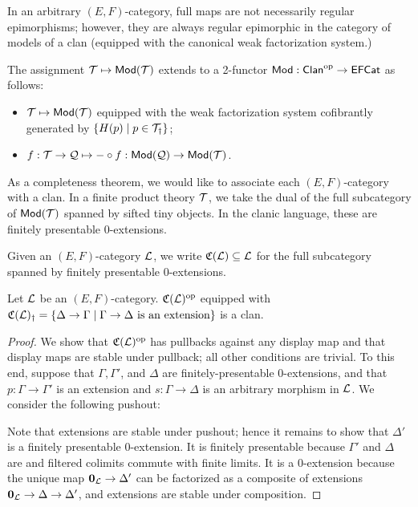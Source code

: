 \documentclass[a4paper]{article}
\begin{document}
\begin{remark}
  In an arbitrary $(E,F)$-category, full maps are not necessarily regular epimorphisms; however, they are always regular epimorphic in the category of models of a clan (equipped with the canonical weak factorization system.)
\end{remark}



\begin{construction}
  The assignment $\mathcal{T} \mapsto \mathsf{Mod}(\mathcal{T})$ extends to a 2-functor $\mathsf{Mod} : \mathsf{Clan}^{\mathrm{op}} \to \mathsf{EFCat}$ as follows:
  \begin{itemize}
  \item $\mathcal{T} \mapsto \mathsf{Mod}(\mathcal{T})$ equipped with the weak factorization system cofibrantly generated by $\{H(p) \mid p \in \mathcal{T}_{\dag}\}$;
  \item $f : \mathcal{T} \to \mathcal{Q} \mapsto - \circ f : \mathsf{Mod}(\mathcal{Q}) \to \mathsf{Mod}(\mathcal{T})$.
  \end{itemize}
\end{construction}

As a completeness theorem, we would like to associate each $(E,F)$-category with a clan.
In a finite product theory $\mathcal{T}$, we take the dual of the full subcategory of $\mathsf{Mod}(\mathcal{T})$ spanned by sifted tiny objects.
In the clanic language, these are finitely presentable $0$-extensions.

\begin{definition}
  Given an $(E,F)$-category $\mathcal{L}$, we write $\mathfrak{C}(\mathcal{L}) \subseteq \mathcal{L}$ for the full subcategory spanned by finitely presentable $0$-extensions.
\end{definition}

\begin{lemma}
  Let $\mathcal{L}$ be an $(E,F)$-category.
  $\mathfrak{C}(\mathcal{L})^{\mathrm{op}}$ equipped with $\mathfrak{C}(\mathcal{L})_{\dag} = \{\Delta \to \Gamma \mid \Gamma \to \Delta~\text{is an extension}\}$ is a clan.
\end{lemma}
\begin{proof}
  We show that $\mathfrak{C}(\mathcal{L})^{\mathrm{op}}$ has pullbacks against any display map and that display maps are stable under pullback; all other conditions are trivial.
  To this end, suppose that $\Gamma, \Gamma'$, and $\Delta$ are finitely-presentable 0-extensions, and that $p : \Gamma \to \Gamma'$ is an extension and $s : \Gamma \to \Delta$ is an arbitrary morphism in $\mathcal{L}$.
  We consider the following pushout:
  \begin{center}
  \end{center}
  Note that extensions are stable under pushout; hence it remains to show that $\Delta'$ is a finitely presentable 0-extension.
  It is finitely presentable because $\Gamma'$ and $\Delta$ are and filtered colimits commute with finite limits.
  It is a 0-extension because the unique map $\mathbf{0}_{\mathcal{L}} \to \Delta'$ can be factorized as a composite of extensions $\mathbf{0}_{\mathcal{L}} \to \Delta \to \Delta'$, and extensions are stable under composition.
\end{proof}
\end{document}
